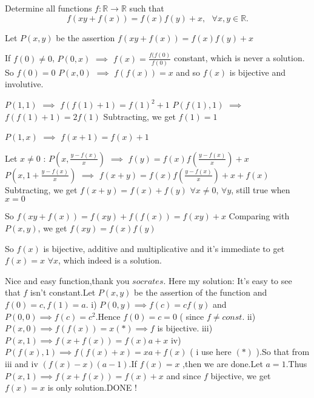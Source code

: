\begin{solution}
	\begin{tcolorbox}Determine all functions $f : \mathbb{R} \to \mathbb{R}$ such that \[f(xy+f(x))=f(x)f(y)+x , \ \ \ \forall x,y \in  \mathbb{R}.\]\end{tcolorbox}
Let $P(x,y)$ be the assertion $f(xy+f(x))=f(x)f(y)+x$

If $f(0)\ne 0$, $P(0,x)$ $\implies$ $f(x)=\frac{f(f(0)}{f(0)}$ constant, which is never a solution. So $f(0)=0$
$P(x,0)$ $\implies$ $f(f(x))=x$ and so $f(x)$ is bijective and involutive.

$P(1,1)$ $\implies$ $f(f(1)+1)=f(1)^2+1$
$P(f(1),1)$ $\implies$ $f(f(1)+1)=2f(1)$
Subtracting, we get $f(1)=1$

$P(1,x)$ $\implies$ $f(x+1)=f(x)+1$

Let $x\ne 0$ :
$P(x,\frac{y-f(x)}x)$ $\implies$ $f(y)=f(x)f(\frac{y-f(x)}x)+x$
$P(x,1+\frac{y-f(x)}x)$ $\implies$ $f(x+y)=f(x)f(\frac{y-f(x)}x)+x+f(x)$
Subtracting, we get $f(x+y)=f(x)+f(y)$ $\forall x\ne 0$, $\forall y$, still true when $x=0$

So $f(xy+f(x))=f(xy)+f(f(x))=f(xy)+x$
Comparing with $P(x,y)$, we get $f(xy)=f(x)f(y)$

So $f(x)$ is bijective, additive and multiplicative and it's immediate to get $\boxed{f(x)=x}$ $\forall x$, which indeed is a solution.
\end{solution}



\begin{solution}
	Nice and easy function,thank you $ socrates $.
Here my solution: It's easy to see that $ f $ isn't constant.Let $ P(x,y) $ be the assertion of the function and $ f(0)=c, f(1)=a $.
i) $ P(0,y) \implies f(c)=cf(y) $ and $ P(0,0) \implies f(c)=c^2 $.Hence $ f(0)=c=0 $ ( since $ f \neq const $.
ii) $ P(x,0) \implies f(f(x))=x (*) \implies f $ is bijective.
iii) $ P(x,1) \implies f(x+f(x))=f(x)a+x $
iv)  $ P(f(x),1) \implies f(f(x)+x)=xa+f(x) $ ( i use here $ (*) $ ).So that from iii and iv $ (f(x)-x)(a-1) $.If $ f(x)=x $ ,then we are done.Let $ a=1 $.Thus 
$ P(x,1) \implies f(x+f(x))=f(x)+x $ and since $ f $ bijective, we get $ f(x)=x $ is only solution.DONE !
\end{solution}



